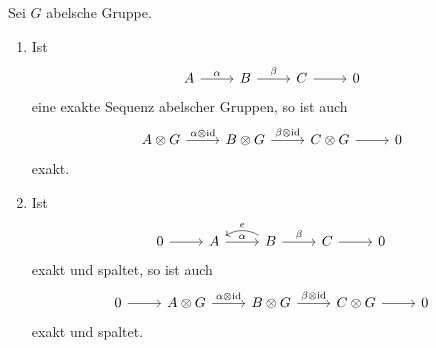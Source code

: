 \begin{bemerkung}
  Sei $G$ abelsche Gruppe.
  \begin{enumerate}
    \item
      Ist
      \begin{equation*}
        \begin{tikzcd}
          A \arrow{r}{\alpha}
          & B \arrow{r}{\beta}
          & C \arrow{r}{}
          & 0
        \end{tikzcd}
      \end{equation*}
      eine exakte Sequenz abelscher Gruppen, so ist auch
      \begin{equation*}
        \begin{tikzcd}
          A \tensor G \arrow{r}{\alpha \tensor \id}
          & B \tensor G \arrow{r}{\beta \tensor \id}
          & C \tensor G \arrow{r}{}
          & 0
        \end{tikzcd}
      \end{equation*}
      exakt.
    \item
      Ist
      \begin{equation*}
        \begin{tikzcd}
          0 \arrow{r}{}
          & A \arrow{r}{\alpha}
          & B \arrow{r}{\beta}
              \arrow[bend right,swap]{l}{e}
          & C \arrow{r}{}
          & 0
        \end{tikzcd}
      \end{equation*}
      exakt und spaltet, so ist auch
      \begin{equation*}
        \begin{tikzcd}
          0 \arrow{r}{}
          & A \tensor G \arrow{r}{\alpha \tensor \id}
          & B \tensor G \arrow{r}{\beta \tensor \id}
          & C \tensor G \arrow{r}{}
          & 0
        \end{tikzcd}
      \end{equation*}
      exakt und spaltet.
  \end{enumerate}
\end{bemerkung}
